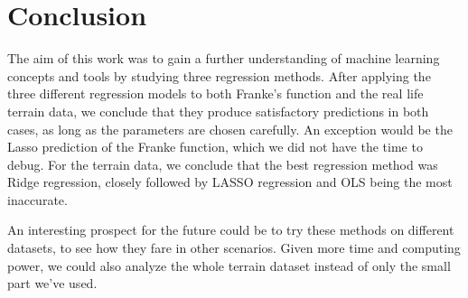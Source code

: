 \documentclass[../main.tex]{subfiles}
\begin{document}
\section{Conclusion}\label{sec:conclusion}
The aim of this work was to gain a further understanding of machine learning concepts and tools by studying three regression methods. After applying the three different regression models to both Franke's function and the real life terrain data, we conclude that they produce satisfactory predictions in both cases, as long as the parameters are chosen carefully. An exception would be the Lasso prediction of the Franke function, which we did not have the time to debug. For the terrain data, we conclude that the best regression method was Ridge regression, closely followed by LASSO regression and OLS being the most inaccurate.

An interesting prospect for the future could be to try these methods on different datasets, to see how they fare in other scenarios. Given more time and computing power, we could also analyze the whole terrain dataset instead of only the small part we've used.
\end{document}
